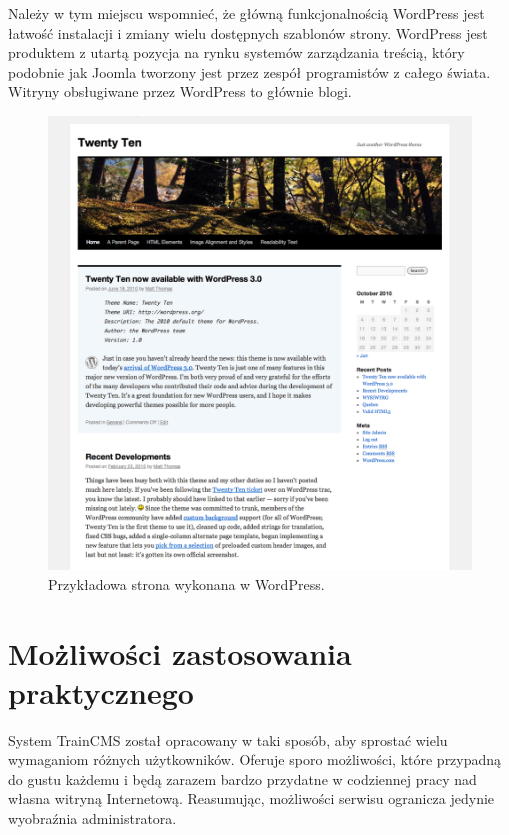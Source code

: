 \documentclass[openright]{xmgr}
\begin{document}
Należy w tym miejscu wspomnieć, że główną funkcjonalnością WordPress jest łatwość instalacji i zmiany wielu dostępnych szablonów strony. WordPress jest produktem z utartą pozycja na rynku systemów zarządzania treścią, który podobnie jak Joomla tworzony jest przez zespół programistów z całego świata. Witryny obsługiwane przez WordPress to głównie blogi.

\newpage

\begin{figure}[!tbh]
\centering
\includegraphics[width=\linewidth]{fig/wordpress}
\caption{Przykładowa strona wykonana w WordPress.}
\end{figure}

\newpage

\section{Możliwości zastosowania praktycznego}

System TrainCMS został opracowany w taki sposób, aby sprostać wielu wymaganiom różnych użytkowników. Oferuje sporo możliwości, które przypadną do gustu każdemu i będą zarazem bardzo przydatne w codziennej pracy nad własna witryną Internetową. Reasumując, możliwości serwisu ogranicza jedynie wyobraźnia administratora.
\end{document}
